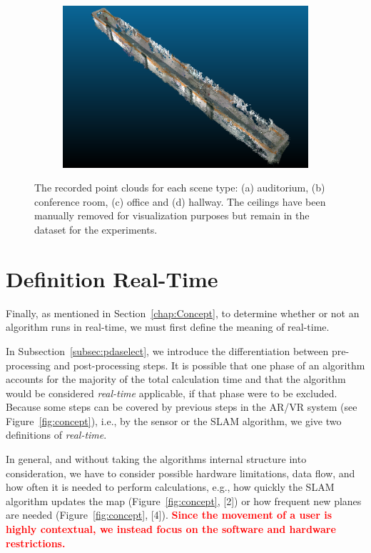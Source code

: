 \documentclass[main.tex]{subfiles}
\begin{document}
\begin{figure}[H]
\begin{subfigure}{0.5\textwidth}
        \caption[Dynamic Dataset office]{}
        \label{fig:fin425}
    \end{subfigure}
    \begin{subfigure}{0.5\textwidth}
        \centering
        \includegraphics[width=0.9\linewidth]{images/hallway.png}
        \caption[Dynamic Dataset office]{}
        \label{fig:finhw}
    \end{subfigure}
    \caption[Dynamic Datasets]{The recorded point clouds for each scene type: (a) auditorium, (b) conference room, (c) office and (d) hallway.
        The ceilings have been manually removed for visualization purposes but remain in the dataset for the experiments.}
    \label{fig:fin}
\end{figure}


\section{Definition Real-Time}\label{sec:realtime}
Finally, as mentioned in Section~\ref{chap:Concept}, to determine whether or not an algorithm runs in real-time, we must first define the meaning of real-time.


In Subsection~\ref{subsec:pdaselect}, we introduce the differentiation between pre-processing and post-processing steps.
It is possible that one phase of an algorithm accounts for the majority of the total calculation time and that the algorithm
would be considered \textit{real-time} applicable, if that phase were to be excluded.
Because some steps can be covered by previous steps in the AR/VR system (see Figure~\ref{fig:concept}), i.e., by the sensor or the SLAM algorithm,
we give two definitions of \textit{real-time}.

In general, and without taking the algorithms internal structure into consideration, we have to consider possible
hardware limitations, data flow, and how often it is needed to perform calculations, e.g., how quickly the SLAM algorithm
updates the map (Figure~\ref{fig:concept}, [2]) or how frequent new planes are needed (Figure~\ref{fig:concept}, [4]). 
\textbf{\textcolor{red}{Since the movement of a user is highly contextual, we instead focus on the software and hardware restrictions.}}
\end{document}

